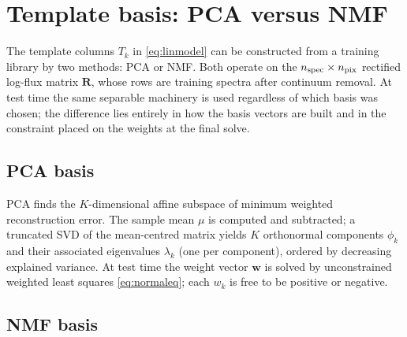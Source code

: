 \documentclass[11pt]{article}
\begin{document}
\section{Template basis: PCA versus NMF}
\label{sec:basis}
The template columns $T_k$ in \eqref{eq:linmodel} can be constructed from a
training library by two methods: PCA or NMF. Both operate on the
$n_{\rm spec}\times n_{\rm pix}$ rectified log-flux matrix $\mathbf{R}$, whose rows
are training spectra after continuum removal. At test time the same separable
machinery is used regardless of which basis was chosen; the difference lies entirely
in how the basis vectors are built and in the constraint placed on the weights at
the final solve.

\subsection*{PCA basis}

PCA finds the $K$-dimensional affine subspace of minimum weighted reconstruction
error. The sample mean $\mu$ is computed and subtracted; a truncated SVD of the
mean-centred matrix yields $K$ orthonormal components $\phi_k$ and their associated
eigenvalues $\lambda_k$ (one per component), ordered by decreasing explained
variance. At test time the weight vector $\mathbf{w}$ is solved by unconstrained
weighted least squares \eqref{eq:normaleq}; each $w_k$ is free to be positive or
negative.

\subsection*{NMF basis}
\end{document}
